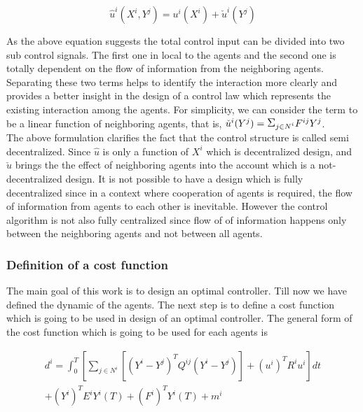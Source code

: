 \documentclass[conference]{IEEEtran}
\begin{document}
\begin{equation}\label{eq:totalControlInput}
\hat{u}^{i}(X^{i},Y^{j})=u^{i}(X^{i})+\check{u}^{i}(Y^{j})
\end{equation}

As the above equation suggests the total control input can be divided into two sub control signals. The first one in local to the agents and the second one is totally dependent on the flow of information from the neighboring agents. Separating these two terms helps to identify the interaction more clearly and provides a better insight in the design of a control law which represents the existing interaction among the agents. For simplicity, we can consider the term to be a linear function of neighboring agents, that is, $\check{u}^{i}(Y^{j})=\mathlarger{\mathlarger{\Sigma}}_{j \in N^{i}} F^{ij}Y^{j}$.\\
The above formulation clarifies the fact that the control structure is called semi decentralized. Since $\hat{u}$ is only a function of $X^{i}$ which is decentralized design, and $\check{u}$ brings the the effect of neighboring agents into the account which is a not-decentralized design. It is not possible to have a design which is fully decentralized since in a context where cooperation of agents is required, the flow of information from agents to each other is inevitable. However the control algorithm is not also fully centralized since flow of of information happens only between the neighboring agents and not between all agents.
\subsubsection{Definition of a cost function}
The main goal of this work is to design an optimal controller. Till now we have defined the dynamic of the agents. The next step is to define a cost function which is going to be used in design of an optimal controller. The general form of the cost function which is going to be used for each agents is

\begin{equation}\label{eq:costFunction}
\begin{split}
d^{i}=\int_{0}^{T}[\sum_{j \in N^{i}}[(Y^{i}-Y^{j})^{T}Q^{ij}(Y^{i}-Y^{j})]+(u^{i})^{T}R^{i}u^{i}]dt\\
+(Y^{i})^{T}E^{i}Y^{i}(T)+(F^{i})^{T}Y^{i}(T)+m^{i}
\end{split}
\end{equation}
\end{document}
